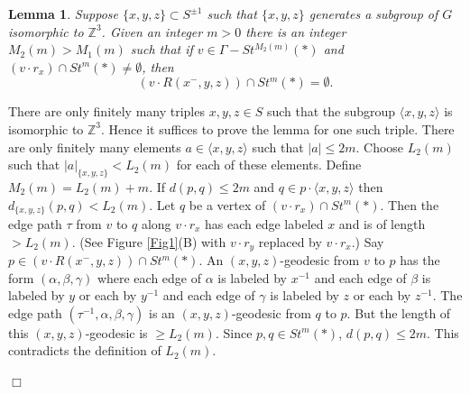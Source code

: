 \documentclass[12pt]{article}
\newtheorem{lemma}[theorem]{Lemma}
\newenvironment{proof}{\addvspace{12pt}\noindent{\bf Proof:}}{
$\Box$\par\addvspace{12pt}}
\numberwithin{equation}{section}
\begin{document}
\begin{lemma}\label{L3}
Suppose $\{x,y,z\}\subset S^{\pm1}$ such that $\{x,y,z\}$ generates a subgroup of $G$ isomorphic to $\mathbb Z^3$. Given an integer $m>0$ there is an integer $M_2(m)>M_1(m)$ such that if  $v\in \Gamma-St^{M_2(m)}(\ast)$ and 
$(v\cdot r_x)\cap St^m(\ast)\ne\emptyset$, then  
$$(v\cdot R(x^-,y,z))\cap St^m(\ast)=\emptyset.$$ 
\end{lemma}
\begin{proof} There are only finitely many triples $x,y,z\in S$ such that the subgroup $\langle x,y,z\rangle$ is isomorphic to $\mathbb Z^3$. Hence it suffices to prove the lemma for one such triple. There are only finitely many elements  $a\in \langle x,y,z\rangle$ such that $|a|\leq 2m$. Choose $L_2(m)$ such that $|a|_{\{x,y,z\}}< L_2(m)$ for each of these elements. Define $M_2(m)=L_2(m)+m$. If $d(p,q)\leq 2m$ and $q\in p\cdot \langle x,y,z\rangle$ then $d_{\{x,y,z\}}(p,q)< L_2(m)$. Let $q$ be a vertex of $(v\cdot r_x)\cap St^m(\ast)$. Then the edge path $\tau$ from $v$ to $q$ along $v\cdot r_x$ has each edge labeled $x$ and is of length $>L_2(m)$. (See Figure \ref{Fig1}(B) with $v\cdot r_y$ replaced by $v\cdot r_x$.) Say $p\in (v\cdot R(x^-,y,z))\cap St^m(\ast)$. An $(x,y,z)$-geodesic from $v$ to $p$ has the form $(\alpha, \beta,\gamma)$ where each edge of $\alpha$ is labeled by $x^{-1}$ and each edge of $\beta$ is labeled by $y$ or each by $y^{-1}$ and each edge of $\gamma$ is labeled by $z$ or each by $z^{-1}$. The edge path $(\tau^{-1}, \alpha, \beta,\gamma)$ is an $(x,y,z)$-geodesic from $q$ to $p$. But the length of this $(x,y,z)$-geodesic is $\geq L_2(m)$. Since $p,q\in St^m(\ast)$, $d(p,q)\leq 2m$. This contradicts the definition of $L_2(m)$. 
\end{proof}
\end{document}

